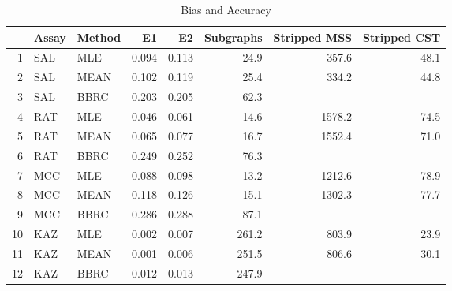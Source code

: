 \begin{table}[t]
\begin{center}
\begin{tabular}{rllrrrrr}
  \hline
 & Assay & Method & E1 & E2 & Subgraphs & Stripped MSS & Stripped CST \\ 
  \hline
1 & SAL & MLE & 0.094 & 0.113 & 24.9 & 357.6 & 48.1 \\ 
  2 & SAL & MEAN & 0.102 & 0.119 & 25.4 & 334.2 & 44.8 \\ 
  3 & SAL & BBRC & 0.203 & 0.205 & 62.3 &  &  \\ 
  4 & RAT & MLE & 0.046 & 0.061 & 14.6 & 1578.2 & 74.5 \\ 
  5 & RAT & MEAN & 0.065 & 0.077 & 16.7 & 1552.4 & 71.0 \\ 
  6 & RAT & BBRC & 0.249 & 0.252 & 76.3 &  &  \\ 
  7 & MCC & MLE & 0.088 & 0.098 & 13.2 & 1212.6 & 78.9 \\ 
  8 & MCC & MEAN & 0.118 & 0.126 & 15.1 & 1302.3 & 77.7 \\ 
  9 & MCC & BBRC & 0.286 & 0.288 & 87.1 &  &  \\ 
  10 & KAZ & MLE & 0.002 & 0.007 & 261.2 & 803.9 & 23.9 \\ 
  11 & KAZ & MEAN & 0.001 & 0.006 & 251.5 & 806.6 & 30.1 \\ 
  12 & KAZ & BBRC & 0.012 & 0.013 & 247.9 &  &  \\ 
   \hline
\end{tabular}
\caption{Bias and Accuracy}
\label{t:anal}
\end{center}
\end{table}
